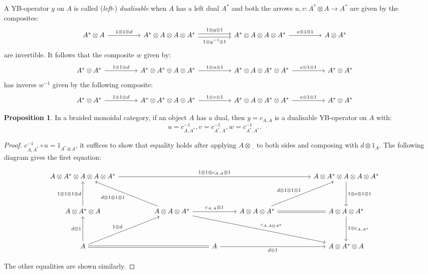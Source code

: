 \documentclass[8pt]{article}
\theoremstyle{definition}
\theoremstyle{definition}
\theoremstyle{definition}
\theoremstyle{definition}
\theoremstyle{definition}
\theoremstyle{definition}
\theoremstyle{definition}
\newtheorem{prop}{Proposition}[section]
\theoremstyle{definition}
\theoremstyle{definition}
\theoremstyle{definition}
\theoremstyle{definition}
\theoremstyle{definition}
\theoremstyle{definition}
\theoremstyle{definition}
\theoremstyle{question}
\begin{document}
  A YB-operator $y$ on $A$ is called (\emph{left}-) \emph{dualisable} when $A$ has a left dual $A^*$ and both the arrows $u, v : A^* \otimes A \to A^*$ are given by the composites:
  \[
  \begin{tikzcd}
    A^* \otimes A \ar[rr, "1 \otimes 1 \otimes d"] && A^* \otimes A \otimes A \otimes A^* \ar[rr, shift left, "1 \otimes y \otimes 1"] \ar[rr, shift right, "1 \otimes y^{-1} \otimes 1"'] && A^* \otimes A \otimes A \otimes A^* \ar[rr, "e \otimes 1 \otimes 1"] && A \otimes A^*
  \end{tikzcd}
  \]
  are invertible. It follows that the composite $w$ given by:
  \[
  \begin{tikzcd}
    A^* \otimes A^* \ar[rr, "1 \otimes 1 \otimes d"] && A^* \otimes A^* \otimes A \otimes A^* \ar[rr, "1 \otimes u \otimes 1"] && A^* \otimes A \otimes A^* \otimes A^* \ar[rr, "e \otimes 1 \otimes 1"] && A^* \otimes A^*
  \end{tikzcd}
  \]
  has inverse $w^{-1}$ given by the following composite:
  \[
  \begin{tikzcd}
    A^* \otimes A^* \ar[rr, "1 \otimes 1 \otimes d"] && A^* \otimes A^* \otimes A \otimes A^* \ar[rr, "1 \otimes v \otimes 1"] && A^* \otimes A \otimes A^* \otimes A^* \ar[rr, "e \otimes 1 \otimes 1"] && A^* \otimes A^*
  \end{tikzcd}
  \]
  \begin{prop}
    In a braided monoidal category, if an object $A$ has a dual, then $y = c_{A,A}$ is a dualisable YB-operator on $A$ with:
    \[
    u = c^{-1}_{A,A^*}, v = c^{-1}_{A^*,A}, w = c^{-1}_{A^*,A^*}.
    \]
  \end{prop}
  \begin{proof}
    $c^{-1}_{A,A^*} \circ u = 1_{A^* \otimes A}$, it suffices to show that equality holds after applying $A \otimes \underline{\:\:}$ to both sides and composing
    with $d \otimes 1_A$. The following diagram gives the first equation:
    \begin{small}
    \[
    \begin{tikzcd}
      A \otimes A^* \otimes A \otimes A \otimes A^* \ar[rrrrrr, "1 \otimes 1 \otimes c_{A,A} \otimes 1"] &&&&&& A \otimes A^* \otimes A \otimes A \otimes A^* \ar[dd, "1 \otimes e \otimes 1 \otimes 1"] \\
      \\
      A \otimes A^* \ar[uu, "1 \otimes 1 \otimes 1 \otimes d"] \otimes A && |[alias=AAA*]| A \otimes A \otimes A^* \ar[uull, "d \otimes 1 \otimes 1 \otimes 1"] \ar[rr, "c_{A,A} \otimes 1"] && A \otimes A \otimes A^* \ar[rr, equal] \ar[uurr, "d \otimes 1 \otimes 1 \otimes 1"] && A \otimes A \otimes A^* \ar[dd, "1 \otimes c_{A,A^*}"] \\
      \\
      A \ar[rrr, equal] \ar[uurr, "1 \otimes d"] \ar[uu, "d \otimes 1"] &&& A \ar[rrr, "d \otimes 1"'] &&& |[alias=AA*A]| A \otimes A^* \otimes A
      \ar[from=AAA*,to=AA*A, "c_{A, A \otimes A^*}"]
    \end{tikzcd}
    \]
  \end{small}
  The other equalities are shown similarly.
  \end{proof}
\end{document}

